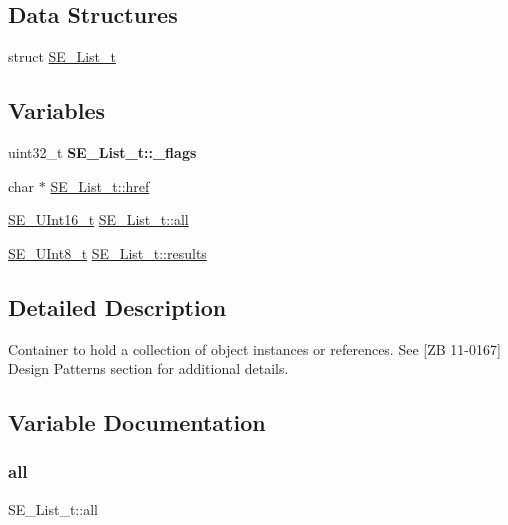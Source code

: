 \subsection*{Data Structures}
\begin{DoxyCompactItemize}
\item 
struct \hyperlink{structSE__List__t}{S\+E\+\_\+\+List\+\_\+t}
\end{DoxyCompactItemize}
\subsection*{Variables}
\begin{DoxyCompactItemize}
\item 
\mbox{\label{group__List_ga0c402dbb82ea0763a774b126a3072410}} 
uint32\+\_\+t {\bfseries S\+E\+\_\+\+List\+\_\+t\+::\+\_\+flags}
\item 
char $\ast$ \hyperlink{group__List_ga292140ab8456be369391e06dec3936e3}{S\+E\+\_\+\+List\+\_\+t\+::href}
\item 
\hyperlink{group__UInt16_gac68d541f189538bfd30cfaa712d20d29}{S\+E\+\_\+\+U\+Int16\+\_\+t} \hyperlink{group__List_gaa4cc7b617e61b09b6420db908051cd17}{S\+E\+\_\+\+List\+\_\+t\+::all}
\item 
\hyperlink{group__UInt8_gaf7c365a1acfe204e3a67c16ed44572f5}{S\+E\+\_\+\+U\+Int8\+\_\+t} \hyperlink{group__List_ga7214cada4051d8f8873195463eddbd7e}{S\+E\+\_\+\+List\+\_\+t\+::results}
\end{DoxyCompactItemize}


\subsection{Detailed Description}
Container to hold a collection of object instances or references. See \mbox{[}ZB 11-\/0167\mbox{]} Design Patterns section for additional details. 

\subsection{Variable Documentation}
\mbox{\label{group__List_gaa4cc7b617e61b09b6420db908051cd17}} 
\subsubsection{\texorpdfstring{all}{all}}
{\footnotesize\ttfamily S\+E\+\_\+\+List\+\_\+t\+::all}


